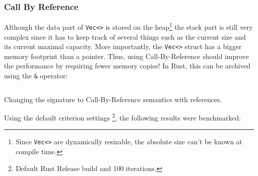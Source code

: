 \subsubsection{Call By Reference}
Although the data part of \texttt{Vec<>} is stored on the heap\footnote{Since \texttt{Vec<>} are dynamically resizable, the absolute size can't be known at compile time.} the stack part is still very complex since it has to keep track of several things such as the current size and its current maximal capacity. More importantly, the \texttt{Vec<>} struct has a bigger memory footprint than a pointer. Thus, using Call-By-Reference should improve the performance by requiring fewer memory copies! In Rust, this can be archived using the \texttt{\&} operator:

\begin{listing}[H]
  \inputminted{rust}{./assets/call_by_ref.rs}
\caption{Changing the signature to Call-By-Reference semantics with references.}
\end{listing}

Using the default criterion settings \footnote{Default Rust Release build and 100 iterations.}, the following results were benchmarked:


